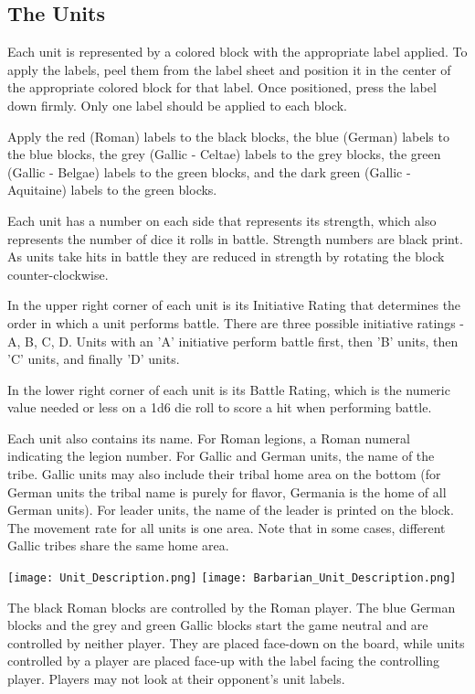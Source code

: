 \par
\subsection{The Units}
Each unit is represented by a colored block with the appropriate label applied. To apply the labels, peel them from the label sheet and position it in the center of the appropriate colored block for that label. Once positioned, press the label down firmly. Only one label should be applied to each block.

Apply the red (Roman) labels to the black blocks, the blue (German) labels to the blue blocks, the grey (Gallic - Celtae) labels to the grey blocks, the green (Gallic - Belgae) labels to the green blocks, and the dark green (Gallic - Aquitaine) labels to the green blocks.

Each unit has a number on each side that represents its strength, which also represents the number of dice it rolls in battle. Strength numbers are black print. As units take hits in battle they are reduced in strength by rotating the block counter-clockwise.

In the upper right corner of each unit is its Initiative Rating that determines the order in which a unit performs battle. There are three possible initiative ratings - A, B, C, D. Units with an 'A' initiative perform battle first, then 'B' units, then 'C' units, and finally 'D' units.

In the lower right corner of each unit is its Battle Rating, which is the numeric value needed or less on a 1d6 die roll to score a hit when performing battle.

Each unit also contains its name. For Roman legions, a Roman numeral indicating the legion number. For Gallic and German units, the name of the tribe. Gallic units may also include their tribal home area on the bottom (for German units the tribal name is purely for flavor, Germania is the home of all German units). For leader units, the name of the leader is printed on the block. The movement rate for all units is one area. Note that in some cases, different Gallic tribes share the same home area.

\texttt{[image: Unit\_Description.png]}
\texttt{[image: Barbarian\_Unit\_Description.png]}

The black Roman blocks are controlled by the Roman player. The blue German blocks and the grey and green Gallic blocks start the game neutral and are controlled by neither player. They are placed face-down on the board, while units controlled by a player are placed face-up with the label facing the controlling player. Players may not look at their opponent's unit labels.

